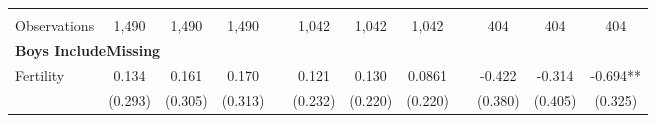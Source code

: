 \begin{landscape}
\begin{table}[htpb!]
\begin{center}
\begin{tabular}{lcccp{2mm}cccp{2mm}ccc}
\begin{footnotesize}\end{footnotesize}&\begin{footnotesize}\end{footnotesize}&\begin{footnotesize}\end{footnotesize}&\begin{footnotesize}\end{footnotesize}&\begin{footnotesize}\end{footnotesize}&\begin{footnotesize}\end{footnotesize}&\begin{footnotesize}\end{footnotesize}&\begin{footnotesize}\end{footnotesize}&\begin{footnotesize}\end{footnotesize}&\begin{footnotesize}\end{footnotesize}&\begin{footnotesize}\end{footnotesize}&\begin{footnotesize}\end{footnotesize}\\Observations&1,490&1,490&1,490&&1,042&1,042&1,042&&404&404&404\\
\multicolumn{12}{l}{\textbf{Boys IncludeMissing}}\\ 
Fertility&0.134&0.161&0.170&&0.121&0.130&0.0861&&-0.422&-0.314&-0.694**\\
&(0.293)&(0.305)&(0.313)&&(0.232)&(0.220)&(0.220)&&(0.380)&(0.405)&(0.325)\\

\end{tabular}
\end{center}
\end{table}
\end{landscape}
